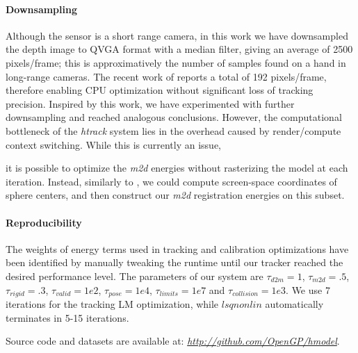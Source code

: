 \paragraph{Downsampling}
Although the \realsense{} sensor is a short range camera, in this work we have downsampled the depth image to QVGA format with a median filter, giving an average of 2500 pixels/frame; this is approximatively the number of samples found on a hand in long-range cameras. The recent work of \cite{taylor2016concerto} reports a total of 192 pixels/frame, therefore enabling CPU optimization without significant loss of tracking precision. Inspired by this work, we have experimented with further downsampling and reached analogous conclusions. However, the computational bottleneck of the \emph{htrack} system lies in the overhead caused by render/compute context switching. While this is currently an issue, 
\begin{draft}
it is possible to optimize the \emph{m2d} energies without  rasterizing the model at each iteration. Instead, similarly to \cite{qian2014realtime}, we could compute screen-space coordinates of sphere centers, and then construct our \emph{m2d} registration energies on this subset.
\end{draft}

\newpage
\paragraph{Reproducibility}
% 
The weights of energy terms used in tracking and calibration optimizations have been identified by manually tweaking the runtime until our tracker reached the desired performance level. 
The parameters of our system are $\tau_{d2m}=1$, $\tau_{m2d}=.5$, $\tau_{rigid}=.3$, $\tau_{valid}=1e2$, $\tau_{pose}=1e4$, $\tau_{limits}=1e7$ and $\tau_{collision}=1e3$. We use 7 iterations for the tracking LM optimization, while $lsqnonlin$ automatically terminates in 5-15 iterations. 
\begin{draft}
Source code and datasets are available at: \emph{\url{http://github.com/OpenGP/hmodel}}.
\end{draft}


